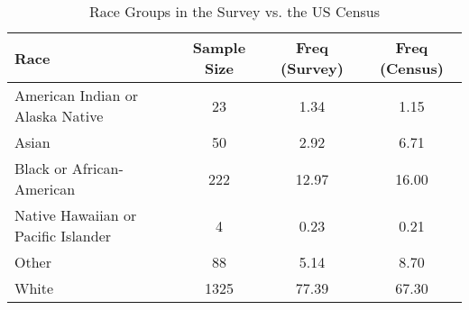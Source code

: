 \begin{table}[th!]
\centering
\caption{Race Groups in the Survey vs. the US Census}
\label{tab-04-census-race.tex}
\begin{tabular}{lccc}
\toprule
                               Race &  Sample Size &  Freq (Survey) &  Freq (Census) \\
\midrule
   American Indian or Alaska Native &           23 &           1.34 &           1.15 \\
                              Asian &           50 &           2.92 &           6.71 \\
          Black or African-American &          222 &          12.97 &          16.00 \\
Native Hawaiian or Pacific Islander &            4 &           0.23 &           0.21 \\
                              Other &           88 &           5.14 &           8.70 \\
                              White &         1325 &          77.39 &          67.30 \\
\bottomrule
\end{tabular}
\end{table}
